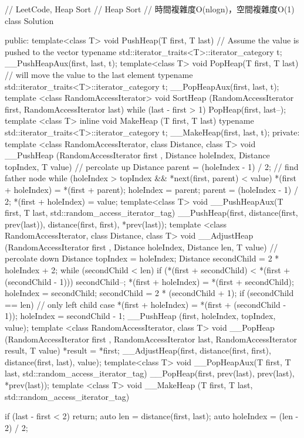 \begin{Code}
// LeetCode, Heap Sort
// Heap Sort
// 時間複雜度O(nlogn)，空間複雜度O(1)
class Solution {
public:
    template<class T>
        void PushHeap(T first, T last)
    {
        // Assume the value is pushed to the vector
        typename std::iterator_traits<T>::iterator_category t;
        __PushHeapAux(first, last, t);
    }
    template<class T>
        void PopHeap(T first, T last)
    {
        // will move the value to the last element
        typename std::iterator_traits<T>::iterator_category t;
        __PopHeapAux(first, last, t);
    }
    template <class RandomAccessIterator>
        void SortHeap (RandomAccessIterator first, RandomAccessIterator last)
    {
        while (last - first > 1)
            PopHeap(first, last--);
    }
    template <class T>
        inline void MakeHeap (T first, T last)
    {
        typename std::iterator_traits<T>::iterator_category t;
        __MakeHeap(first, last, t);
    }
private:
    template <class RandomAccessIterator, class Distance, class T>
    void __PushHeap (RandomAccessIterator first
                    , Distance holeIndex, Distance topIndex, T value)
    {
        // percolate up
        Distance parent = (holeIndex - 1) / 2; // find father node
        while (holeIndex > topIndex && *next(first, parent) < value)
        {
            *(first + holeIndex) = *(first + parent);
            holeIndex = parent;
            parent = (holeIndex - 1) / 2;
        }
        *(first + holeIndex) = value;
    }
    template<class T>
        void __PushHeapAux(T first, T last, std::random_access_iterator_tag)
    {
        __PushHeap(first, distance(first, prev(last)), distance(first, first), *prev(last));
    }
    template <class RandomAccessIterator, class Distance, class T>
    void __AdjustHeap (RandomAccessIterator first
                      , Distance holeIndex, Distance len, T value)
    {
        // percolate down
        Distance topIndex = holeIndex;
        Distance secondChild = 2 * holeIndex + 2;
        while (secondChild < len)
        {
            if (*(first + secondChild) < *(first + (secondChild - 1)))
                secondChild--;
            *(first + holeIndex) = *(first + secondChild);
            holeIndex = secondChild;
            secondChild = 2 * (secondChild + 1);
        }
        if (secondChild == len) // only left child case
        {
            *(first + holeIndex) = *(first + (secondChild - 1));
            holeIndex = secondChild - 1;
        }
        __PushHeap (first, holeIndex, topIndex, value);
    }
    template <class RandomAccessIterator, class T>
    void __PopHeap (RandomAccessIterator first
                   , RandomAccessIterator last, RandomAccessIterator result, T value)
    {
        *result = *first;
        __AdjustHeap(first, distance(first, first), distance(first, last), value);
    }
    template<class T>
        void __PopHeapAux(T first, T last, std::random_access_iterator_tag)
    {
        __PopHeap(first, prev(last), prev(last), *prev(last));
    }
    template <class T>
        void __MakeHeap (T first, T last, std::random_access_iterator_tag)
    {
        if (last - first < 2) return;
        auto len = distance(first, last);
        auto holeIndex = (len - 2) / 2;

}}
\end{Code}
